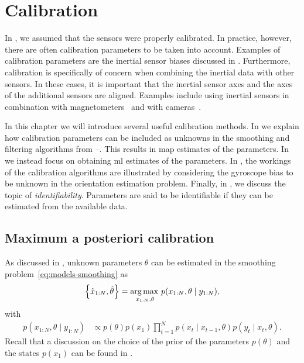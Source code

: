 \chapter{Calibration}
\label{cha:calibration} 
In , we assumed that the sensors were properly calibrated. In practice, however, there are often calibration parameters to be taken into account. Examples of calibration parameters are the inertial sensor biases discussed in . Furthermore, calibration is specifically of concern when combining the inertial data with other sensors. In these cases, it is important that the inertial sensor axes and the axes of the additional sensors are aligned. Examples include using inertial sensors in combination with magnetometers~\citep{kokS:2016,salehiMB:2012,bonnetBGLB:2009} and with cameras~\citep{holSG:2010b,loboD:2007,mirzaeiR:2008}.

In this chapter we will introduce several useful calibration methods. In  we explain how calibration parameters can be included as unknowns in the smoothing and filtering algorithms from --. This results in \gls{map} estimates of the parameters. In  we instead focus on obtaining \gls{ml} estimates of the parameters. In , the workings of the calibration algorithms are illustrated by considering the gyroscope bias to be unknown in the orientation estimation problem. Finally, in , we discuss the topic of \emph{identifiability}. Parameters are said to be identifiable if they can be estimated from the available data.  

\section{Maximum a posteriori calibration}
\label{sec:calibration-map}
As discussed in , unknown parameters $\theta$ can be estimated in the smoothing problem~\eqref{eq:models-smoothing} as
\begin{align}
\label{eq:calibration-smoothing}
\left \{ \hat{x}_{1:N},\hat{\theta} \right \} = \operatorname*{arg \, max \,}_{x_{1:N}, \theta} p(x_{1:N}, \theta \mid y_{1:N}),
\end{align}
with 
\begin{align}
p(x_{1:N}, \theta \mid y_{1:N} ) &\propto p(\theta) p(x_1) \prod_{t=1}^N p(x_t \mid x_{t-1}, \theta) p(y_t \mid x_t, \theta).
\end{align}
Recall that a discussion on the choice of the prior of the parameters $p(\theta)$ and the states $p(x_1)$ can be found in . 

